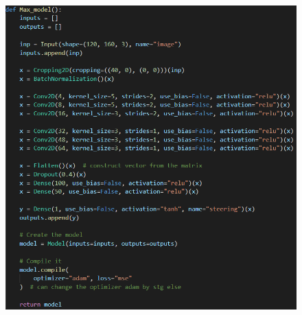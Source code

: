 \documentclass[12pt]{article}
\begin{document}
\begin{figure}[h]
{        \includegraphics[height=0.49\textheight]{../../docs/model-maxg.png}%
        \label{fig:b}%
        }%
    \hfill %
\end{figure}
\end{document}

